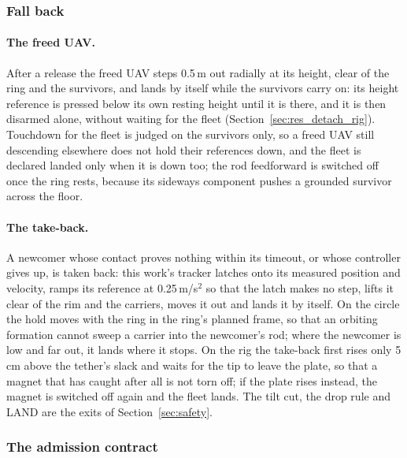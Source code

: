 \subsubsection{Fall back}

\paragraph{The freed UAV.} After a release the freed UAV steps 0.5\,m out radially at its height, clear of the ring
and the survivors, and lands by itself while the survivors carry on: its height reference is pressed below its own
resting height until it is there, and it is then disarmed alone, without waiting for the fleet
(Section~\ref{sec:res_detach_rig}). Touchdown for the fleet is judged on the survivors only, so a freed UAV still
descending elsewhere does not hold their references down, and the fleet is declared landed only when it is down
too; the rod feedforward is switched off once the ring rests, because its sideways component pushes a grounded
survivor across the floor.

\paragraph{The take-back.} A newcomer whose contact proves nothing within its timeout, or whose controller gives
up, is taken back: this work's tracker latches onto its measured position and velocity, ramps its reference at
0.25\,m/s$^2$ so that the latch makes no step, lifts it clear of the rim and the carriers, moves it out and lands it
by itself. On the circle the hold moves with the ring in the ring's planned frame, so that an orbiting formation
cannot sweep a carrier into the newcomer's rod; where the newcomer is low and far out, it lands where it stops. On
the rig the take-back first rises only 5\,cm above the tether's slack and waits for the tip to leave the plate, so
that a magnet that has caught after all is not torn off; if the plate rises instead, the magnet is switched off
again and the fleet lands. The tilt cut, the drop rule and LAND are the exits of Section~\ref{sec:safety}.

\subsubsection{The admission contract}
\label{sec:admission}


